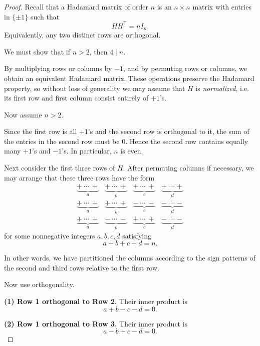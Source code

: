 \documentclass[11pt, a4paper]{ctexrep}
\begin{document}
\begin{proof}
    Recall that a Hadamard matrix of order $n$ is an $n\times n$ matrix
    with entries in $\{\pm1\}$ such that
    \[
        HH^{\mathsf T}=nI_n.
    \]
    Equivalently, any two distinct rows are orthogonal.

    We must show that if $n>2$, then $4\mid n$.

    By multiplying rows or columns by $-1$, and by permuting rows or columns,
    we obtain an equivalent Hadamard matrix. These operations preserve the
    Hadamard property, so without loss of generality we may assume that $H$
    is \emph{normalized}, i.e. its first row and first column consist entirely of $+1$'s.

    Now assume $n>2$.

    Since the first row is all $+1$'s and the second row is orthogonal to it, the sum of
    the entries in the second row must be $0$. Hence the second row contains equally many
    $+1$'s and $-1$'s. In particular, $n$ is even.

    Next consider the first three rows of $H$.
    After permuting columns if necessary, we may arrange that these three rows have the form
    \[
        \begin{array}{cccc}
            \underbrace{+\ \cdots\ +}_{a}
             & \underbrace{+\ \cdots\ +}_{b}
             & \underbrace{+\ \cdots\ +}_{c}
             & \underbrace{+\ \cdots\ +}_{d} \\[4pt]
            \underbrace{+\ \cdots\ +}_{a}
             & \underbrace{+\ \cdots\ +}_{b}
             & \underbrace{-\ \cdots\ -}_{c}
             & \underbrace{-\ \cdots\ -}_{d} \\[4pt]
            \underbrace{+\ \cdots\ +}_{a}
             & \underbrace{-\ \cdots\ -}_{b}
             & \underbrace{+\ \cdots\ +}_{c}
             & \underbrace{-\ \cdots\ -}_{d}
        \end{array}
    \]
    for some nonnegative integers $a,b,c,d$ satisfying
    \[
        a+b+c+d=n.
    \]

    In other words, we have partitioned the columns according to the sign patterns of
    the second and third rows relative to the first row.

    Now use orthogonality.

    \medskip
    \noindent
    \textbf{(1) Row 1 orthogonal to Row 2.}
    Their inner product is
    \[
        a+b-c-d=0.
    \]

    \noindent
    \textbf{(2) Row 1 orthogonal to Row 3.}
    Their inner product is
    \[
        a-b+c-d=0.
    \]


\end{proof}
\end{document}

